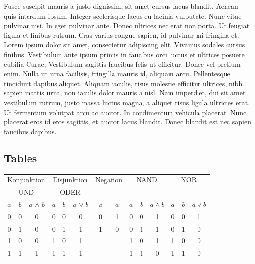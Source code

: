 \documentclass[12pt, a4paper, onepage, english,singlespacing, parskip]{scrartcl}
\begin{document}
\begin{appendices}
Fusce suscipit mauris a justo dignissim, sit amet cursus lacus blandit. Aenean quis interdum ipsum. Integer scelerisque lacus eu lacinia vulputate. Nunc vitae pulvinar nisi. In eget pulvinar ante. Donec ultrices nec erat non porta. Ut feugiat ligula et finibus rutrum. Cras varius congue sapien, id pulvinar mi fringilla et.
%
%
Lorem ipsum dolor sit amet, consectetur adipiscing elit. Vivamus sodales cursus finibus. Vestibulum ante ipsum primis in faucibus orci luctus et ultrices posuere cubilia Curae; Vestibulum sagittis faucibus felis ut efficitur. Donec vel pretium enim. Nulla ut urna facilisis, fringilla mauris id, aliquam arcu. Pellentesque tincidunt dapibus aliquet. Aliquam iaculis, risus molestie efficitur ultrices, nibh sapien mattis urna, non iaculis dolor mauris a nisl. Nam imperdiet, dui sit amet vestibulum rutrum, justo massa luctus magna, a aliquet risus ligula ultricies erat. Ut fermentum volutpat arcu ac auctor. In condimentum vehicula placerat. Nunc placerat eros id eros sagittis, et auctor lacus blandit. Donec blandit est nec sapien faucibus dapibus.

\subsection{Tables}
\begin{center}
	\begin{tabular}[c]{c | c | c || c| c | c || c | c || c | c | c || c| c| c}
		\multicolumn{3}{c||}{Konjunktion}	&	\multicolumn{3}{c||}{Disjunktion} & \multicolumn{2}{c||}{Negation} & \multicolumn{3}{c||}{NAND} & \multicolumn{3}{c}{NOR}\\
		\multicolumn{3}{c||}{UND}	&	\multicolumn{3}{c||}{ODER} & \multicolumn{2}{c||}{} & \multicolumn{3}{c||}{} & \multicolumn{3}{c}{}\\
		\hline
		$a$ & $b$ & $a$ $\wedge$ $b$ & $a$ & $b$ & $a$ $\vee$ $b$ & $a$ & $\bar{a}$ & $a$ & $b$ & $\overline{a \wedge b}$ & $a$ & $b$ & $\overline{a \vee b}$\\
		\hline
		0 & 0 & 0 & 0 & 0 & 0 & 0 & 1 & 0 & 0 & 1 & 0 & 0 & 1\\
		0 & 1 & 0 & 0 & 1 & 1 & 1 & 0 & 0 & 1 & 1 & 0 & 1 & 0\\
		1 & 0 & 0 & 1 & 0 & 1 & & & 1 & 0 & 1 & 1 & 0 & 0\\
		1 & 1 & 1 & 1 & 1 & 1 & & & 1 & 1 & 0 & 1 & 1 & 0\\
		\hline
	\end{tabular}
\end{center}

\end{appendices}
\end{document}
